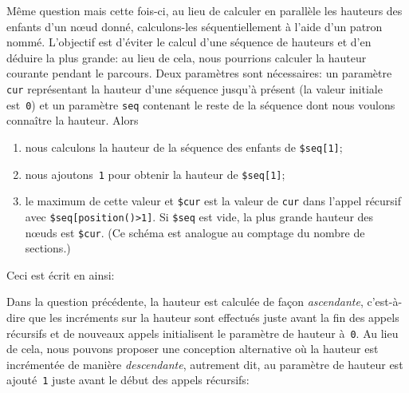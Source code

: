 Même question mais cette fois-ci, au lieu de calculer en parallèle les
hauteurs des enfants d'un n{\oe}ud donné, calculons-les
séquentiellement à l'aide d'un patron nommé. L'objectif est d'éviter
le calcul d'une séquence de hauteurs et d'en déduire la plus grande:
au lieu de cela, nous pourrions calculer la hauteur courante pendant
le parcours. Deux paramètres sont nécessaires: un paramètre
\texttt{cur} représentant la hauteur d'une séquence jusqu'à présent
(la valeur initiale est~\texttt{0}) et un paramètre \texttt{seq}
contenant le reste de la séquence dont nous voulons connaître la
hauteur. Alors
\begin{enumerate}

  \item nous calculons la hauteur de la séquence des enfants de
    \texttt{\$seq[1]};

  \item nous ajoutons~\texttt{1} pour obtenir la hauteur de
    \texttt{\$seq[1]};

  \item le maximum de cette valeur et \texttt{\$cur} est la valeur de
    \texttt{cur} dans l'appel récursif avec
    \texttt{\$seq[position()>1]}. Si \texttt{\$seq} est vide, la plus
    grande hauteur des n{\oe}uds est \texttt{\$cur}. (Ce schéma est
    analogue au comptage du nombre de sections.)

\end{enumerate}
\noindent Ceci est écrit en \XSLT ainsi:

Dans la question précédente, la hauteur est calculée de façon
\emph{ascendante}, c'est-à-dire que les incréments sur la hauteur sont
effectués juste avant la fin des appels récursifs et de nouveaux
appels initialisent le paramètre de hauteur à~\texttt{0}. Au lieu de
cela, nous pouvons proposer une conception alternative où la hauteur
est incrémentée de manière \emph{descendante}, autrement dit, au
paramètre de hauteur est ajouté~\texttt{1} juste avant le début des
appels récursifs:



